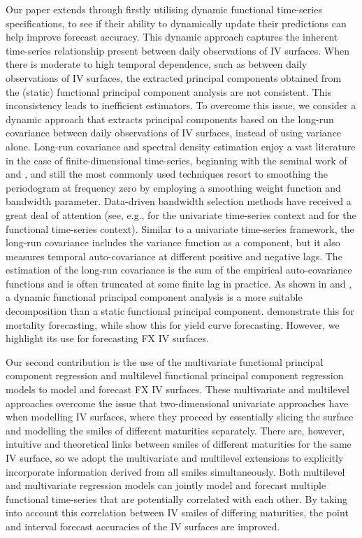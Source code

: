 \documentclass[12pt,a4paper]{article}
\begin{document}
Our paper extends \cite{KCM18} through firstly utilising dynamic functional time-series specifications, to see if their ability to dynamically update their predictions can help improve forecast accuracy. This dynamic approach captures the inherent time-series relationship present between daily observations of IV surfaces. When there is moderate to high temporal dependence, such as between daily observations of IV surfaces, the extracted principal components obtained from the (static) functional principal component analysis are not consistent. This inconsistency leads to inefficient estimators. To overcome this issue, we consider a dynamic approach that extracts principal components based on the long-run covariance between daily observations of IV surfaces, instead of using variance alone. Long-run covariance and spectral density estimation enjoy a vast literature in the case of finite-dimensional time-series, beginning with the seminal work of \cite{Bartlett50} and \cite{Parzen57}, and still the most commonly used techniques resort to smoothing the periodogram at frequency zero by employing a smoothing weight function and bandwidth parameter. Data-driven bandwidth selection methods have received a great deal of attention (see, e.g., \cite{Andrews91} for the univariate time-series context and \cite{RS17} for the functional time-series context). Similar to a univariate time-series framework, the long-run covariance includes the variance function as a component, but it also measures temporal auto-covariance at different positive and negative lags. The estimation of the long-run covariance is the sum of the empirical auto-covariance functions and is often truncated at some finite lag in practice. As shown in \cite{Shang19} and \cite{MGG20}, a dynamic functional principal component analysis is a more suitable decomposition than a static functional principal component. \cite{Shang19} demonstrate this for mortality forecasting, while \cite{MGG20} show this for yield curve forecasting. However, we highlight its use for forecasting FX IV surfaces.

Our second contribution is the use of the multivariate functional principal component regression \citep[see, e.g.,][]{SY17} and multilevel functional principal component regression models \citep[see, e.g.,][]{SSB+16} to model and forecast FX IV surfaces. These multivariate and multilevel approaches overcome the issue that two-dimensional univariate approaches have when modelling IV surfaces, where they proceed by essentially slicing the surface and modelling the smiles of different maturities separately. There are, however, intuitive and theoretical links between smiles of different maturities for the same IV surface, so we adopt the multivariate and multilevel extensions to explicitly incorporate information derived from all smiles simultaneously. Both multilevel and multivariate regression models can jointly model and forecast multiple functional time-series that are potentially correlated with each other. By taking into account this correlation between IV smiles of differing maturities, the point and interval forecast accuracies of the IV surfaces are improved.
\end{document}

